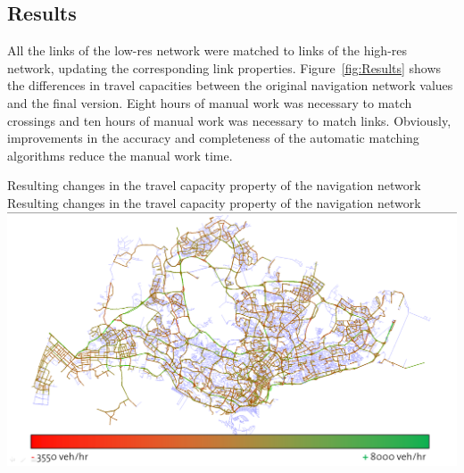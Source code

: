 \subsection{Results}
All the links of the low-res network were matched to links of the high-res network, updating the corresponding link properties. Figure~\ref{fig:Results} shows the differences in travel capacities between the original navigation network values and the final version. Eight hours of manual work was necessary to match crossings and ten hours of manual work was necessary to match links. Obviously, improvements in the accuracy and completeness of the automatic matching algorithms reduce the manual work time.

\createfigure
{Resulting changes in the travel capacity property of the navigation network}
{Resulting changes in the travel capacity property of the navigation network}
{\label{fig:Results}}
{\includegraphics[width=1.0\textwidth]{extending/figures/netEdSing/Result.png}}
{}

